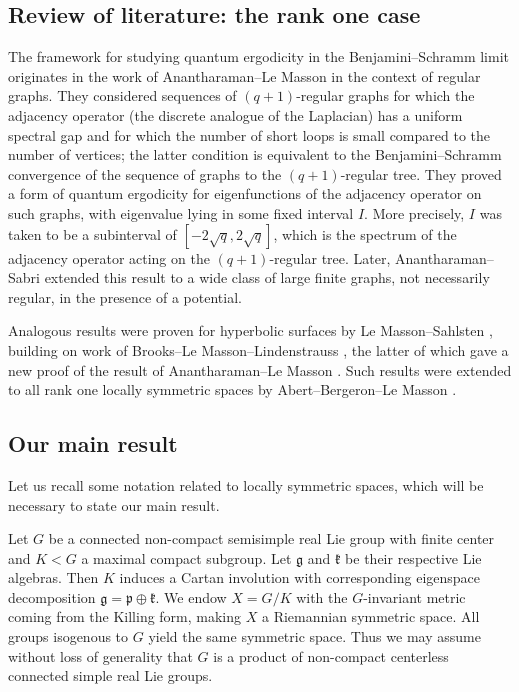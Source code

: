 \documentclass[12pt]{amsart}
\theoremstyle{remark}
\begin{document}
\subsection{Review of literature: the rank one case}
The framework for studying quantum ergodicity in the Benjamini--Schramm limit originates in the work of Anantharaman--Le Masson \cite{Anantharaman_Le_Masson} in the context of regular graphs. They considered sequences of $(q+1)$-regular graphs for which the adjacency operator (the discrete analogue of the Laplacian) has a uniform spectral gap and for which the number of short loops is small compared to the number of vertices; the latter condition is equivalent to the Benjamini--Schramm convergence of the sequence of graphs to the $(q+1)$-regular tree. They proved a form of quantum ergodicity for eigenfunctions of the adjacency operator on such graphs, with eigenvalue lying in some fixed interval $I$. More precisely, $I$ was taken to be a subinterval of $[-2 \sqrt{q}, 2 \sqrt{q}]$, which is the spectrum of the adjacency operator acting on the $(q+1)$-regular tree. Later, Anantharaman--Sabri \cite{Anantharaman_Sabri} extended this result to a wide class of large finite graphs, not necessarily regular, in the presence of a potential.

Analogous results were proven for hyperbolic surfaces by Le Masson--Sahlsten \cite{Le_Masson_Sahlsten_17}, building on work of Brooks--Le Masson--Lindenstrauss \cite{Brooks_Le_Masson_Lindenstrauss}, the latter of which gave a new proof of the result of Anantharaman--Le Masson \cite{Anantharaman_Le_Masson}. Such results were extended to all rank one locally symmetric spaces by Abert--Bergeron--Le Masson \cite{Abert_Bergeron_Le_Masson_22}. 


\subsection{Our main result}\label{sec:main-result}
Let us recall some notation related to locally symmetric spaces, which will be necessary to state our main result.

Let $G$ be a connected non-compact semisimple real Lie group with finite center and $K<G$ a maximal compact subgroup. Let $\mathfrak{g}$ and $\mathfrak{k}$ be their respective Lie algebras. Then $K$ induces a Cartan involution with corresponding eigenspace decomposition $\mathfrak{g} = \mathfrak{p} \oplus \mathfrak{k}$. We endow $X=G/K$ with the $G$-invariant metric coming from the Killing form, making $X$ a Riemannian symmetric space. All groups isogenous to $G$ yield the same symmetric space. Thus we may assume without loss of generality that $G$ is a product of non-compact centerless connected simple real Lie groups.
\end{document}

